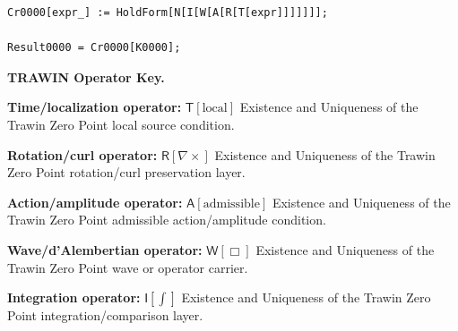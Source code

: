\begin{minipage}[t]{0.49\linewidth}
\begin{minipage}[t]{0.49\linewidth}
\begin{minipage}[t]{0.49\linewidth}
\begin{minipage}[t]{0.49\linewidth}
\begin{minipage}[t]{0.49\linewidth}
\begin{minipage}[t]{0.49\linewidth}
\begin{minipage}[t]{0.49\linewidth}
\begin{minipage}[t]{0.49\linewidth}
\begin{minipage}[t]{0.49\linewidth}
\begin{minipage}[t]{0.49\linewidth}
\begin{minipage}[t]{0.49\linewidth}
\begin{minipage}[t]{0.49\linewidth}
\begin{minipage}[t]{0.49\linewidth}
\begin{minipage}[t]{0.49\linewidth}
\begin{minipage}[t]{0.49\linewidth}
\begin{minipage}[t]{0.49\linewidth}
\begin{minipage}[t]{0.49\linewidth}
\begin{minipage}[t]{0.49\linewidth}
\begin{minipage}[t]{0.49\linewidth}
\begin{minipage}[t]{0.49\linewidth}
\begin{minipage}[t]{0.49\linewidth}
\begin{minipage}[t]{0.49\linewidth}
\begin{minipage}[t]{0.49\linewidth}
\begin{minipage}[t]{0.49\linewidth}
\begin{minipage}[t]{0.49\linewidth}
\begin{minipage}[t]{0.49\linewidth}
\begin{minipage}[t]{0.49\linewidth}
\begin{minipage}[t]{0.49\linewidth}
\begin{minipage}[t]{0.49\linewidth}
\begin{minipage}[t]{0.49\linewidth}
\begin{minipage}[t]{0.49\linewidth}
\begin{minipage}[t]{0.49\linewidth}
\begin{minipage}[t]{0.47\linewidth}
\begin{Verbatim}[fontsize=\tiny,breaklines=true,breakanywhere=true]
Cr0000[expr_] := HoldForm[N[I[W[A[R[T[expr]]]]]]];

Result0000 = Cr0000[K0000];
\end{Verbatim}
\endgroup
\end{minipage}

\par\vspace{0.45\baselineskip}
\noindent\begin{minipage}[t]{\linewidth}
\begingroup
\small
\raggedright
\textbf{TRAWIN Operator Key.}\par
\noindent\textbf{Time/localization operator:} $\mathsf{T}\!\left[\mathrm{local}\right]$ Existence and Uniqueness of the Trawin Zero Point local source condition.\par
\noindent\textbf{Rotation/curl operator:} $\mathsf{R}\!\left[\nabla\times\right]$ Existence and Uniqueness of the Trawin Zero Point rotation/curl preservation layer.\par
\noindent\textbf{Action/amplitude operator:} $\mathsf{A}\!\left[\mathrm{admissible}\right]$ Existence and Uniqueness of the Trawin Zero Point admissible action/amplitude condition.\par
\noindent\textbf{Wave/d'Alembertian operator:} $\mathsf{W}\!\left[\Box\right]$ Existence and Uniqueness of the Trawin Zero Point wave or operator carrier.\par
\noindent\textbf{Integration operator:} $\mathsf{I}\!\left[\int\right]$ Existence and Uniqueness of the Trawin Zero Point integration/comparison layer.\par

\end{minipage}
\end{minipage}
\end{minipage}
\end{minipage}
\end{minipage}
\end{minipage}
\end{minipage}
\end{minipage}
\end{minipage}
\end{minipage}
\end{minipage}
\end{minipage}
\end{minipage}
\end{minipage}
\end{minipage}
\end{minipage}
\end{minipage}
\end{minipage}
\end{minipage}
\end{minipage}
\end{minipage}
\end{minipage}
\end{minipage}
\end{minipage}
\end{minipage}
\end{minipage}
\end{minipage}
\end{minipage}
\end{minipage}
\end{minipage}
\end{minipage}
\end{minipage}
\end{minipage}
